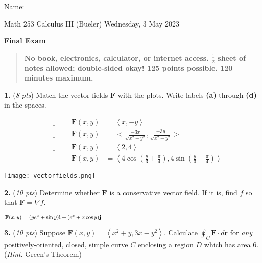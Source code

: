 \documentclass[11pt]{amsart}
\newcommand{\bi}{\mathbf{i}}
\newcommand{\bj}{\mathbf{j}}
\newcommand{\br}{\mathbf{r}}
\newcommand{\bF}{\mathbf{F}}
\newcommand{\grad}{\nabla}
\newcommand{\prob}[1]{\bigskip\noindent\textbf{#1.} }
\newcommand{\pts}[1]{(\emph{#1 pts})}
\newcommand{\probpts}[2]{\prob{#1} \pts{#2} \quad}
\begin{document}
\hfill \Large Name:\underline{\phantom{Ed Bueler really really long long long name}}
\medskip

\scriptsize \noindent Math 253 Calculus III (Bueler) \hfill Wednesday, 3 May 2023
\medskip

\LARGE\centerline{\textbf{Final Exam}}

\smallskip
\begin{quote}
\large
\textbf{No book, electronics, calculator, or internet access.  $\frac{1}{2}$ sheet of notes allowed; double-sided okay!  125 points possible.  120 minutes maximum.}
\end{quote}

\normalsize
\medskip

\thispagestyle{empty}

\probpts{1}{8}  Match the vector fields $\bF$ with the plots.  Write labels \textbf{(a)} through \textbf{(d)} in the spaces.

\vspace{20mm}

\hspace{-10mm}
\begin{minipage}{0.4\textwidth}
\begin{align*}
\underline{\phantom{foobar}} \quad \bF(x,y) &= \left<x,-y\right> \\
\underline{\phantom{foobar}} \quad \bF(x,y) &= \Big<\textstyle{\frac{-3x}{\sqrt{x^2+y^2}},\frac{-3y}{\sqrt{x^2+y^2}}}\Big> \\
\underline{\phantom{foobar}} \quad \bF(x,y) &= \left<2,4\right>  \\
\underline{\phantom{foobar}} \quad \bF(x,y) &= \left<4 \cos(\textstyle{\frac{y}{3} + \frac{\pi}{4}}),4 \sin(\textstyle{\frac{y}{3} + \frac{\pi}{4}})\right>
\end{align*}
\end{minipage}

\vspace{-40mm}

\mbox{\hspace{75mm}\texttt{[image: vectorfields.png]}}
\medskip

\probpts{2}{10}  Determine whether $\bF$ is a conservative vector field.  If it is, find $f$ so that $\bF = \grad f$.

\medskip
    $$\bF(x,y) = (ye^x + \sin y)\bi + (e^x + x \cos y)\bj \hspace{4.0in}$$
\vfill


\clearpage\newpage
\probpts{3}{10}  Suppose $\bF(x,y) = \left<x^2+y,3x-y^2\right>$.  Calculate $\displaystyle\oint_C \bF\cdot d\br$ for \emph{any} positively-oriented, closed, simple curve $C$ enclosing a region $D$ which has area $6$.  (\emph{Hint}.  Green's Theorem)
\vfill
\end{document}
